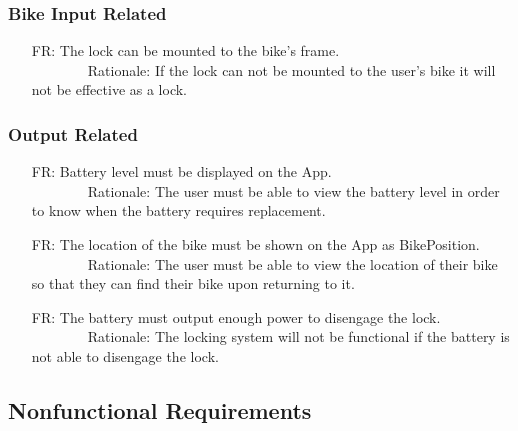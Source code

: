 \documentclass[12pt]{article}
\newcounter{reqnum} %
\begin{document}
\subsubsection{Bike Input Related}
\begin{itemize}
\setlength{\itemindent}{.5in}
\item[FR\refstepcounter{reqnum}\thereqnum\label{FRBikeFrame}:] The lock can be mounted to the bike's frame.
\\ \-\ \-\ \-\ \-\ \-\ \-\ \-\ \-\ Rationale: If the lock can not be mounted to the user's bike it will not be effective as a lock.
\end{itemize}

\subsubsection{Output Related}
\begin{itemize}
\setlength{\itemindent}{.5in}
\item[FR\refstepcounter{reqnum}\thereqnum\label{FRBatteryLevelDisplay}:] Battery level must be displayed on the App.
\\ \-\ \-\ \-\ \-\ \-\ \-\ \-\ \-\ Rationale: The user must be able to view the battery level in order to know when the battery requires replacement.
\item[FR\refstepcounter{reqnum}\thereqnum\label{FRLocDisplay}:] The location of the bike must be shown on the App as BikePosition.
\\ \-\ \-\ \-\ \-\ \-\ \-\ \-\ \-\ Rationale: The user must be able to view the location of their bike so that they can find their bike upon returning to it.
\item[FR\refstepcounter{reqnum}\thereqnum\label{FRPower}:] The battery must output enough power to disengage the lock.
\\ \-\ \-\ \-\ \-\ \-\ \-\ \-\ \-\ Rationale: The locking system will not be functional if the battery is not able to disengage the lock.
\end{itemize}

\subsection{Nonfunctional Requirements}
\end{document}
